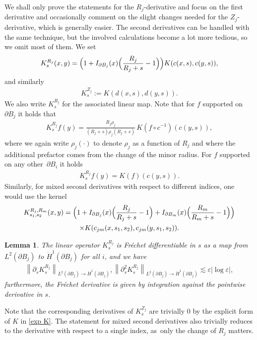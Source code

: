 \documentclass[10pt]{amsart}
\let\epsilon\varepsilon
\newtheorem{lemma}[theorem]{Lemma}
\theoremstyle{definition}
\newcommand\norm[1]{\left\lVert #1\right\rVert}
\newcommand\eq{=}
\let\de\partial
\let\eps\epsilon
\begin{document}
We shall only prove the statements for the $R_j$-derivative and focus on the first derivative and occasionally comment on the slight changes needed for the $Z_j$-derivative, which is generally easier. The second derivatives can be handled with the same technique, but the involved calculations become a lot more tedious, so we omit most of them.
We set
\begin{align*}
K_s^{R_j}(x,y)\eq \Bigl(1+I_{\de B_j}(x) \Bigl(\frac{R_j}{R_j+s}-1 \Bigr) \Bigr)K(c(x,s),c(y,s)),
\end{align*}
and similarly
\begin{align*}
K_s^{Z_j}:=K(d(x,s),d(y,s)).
\end{align*}
We also write $K_s^{R_j}$ for the associated linear map. Note that for $f$ supported on $\de B_j$ it holds that
\begin{align*}
K_s^{R_j}f(y)\eq\frac{R_j\rho_j}{(R_j+s)\rho_j(R_j+s)}\,K(f\circ c^{-1})(c(y,s)),
\end{align*}
where we again write $\rho_j(\cdot)$ to denote $\rho_j$ as a function of $R_j$ and where the additional prefactor comes from the change of the minor radius. For $f$ supported on any other~$\de B_i$ it holds
\begin{align*}
K_s^{R_j}f(y)\eq K(f)(c(y,s)).
\end{align*}
Similarly, for mixed second derivatives with respect to different indices, one would use the kernel\vspace*{-5pt}
\begin{multline*}
K_{s_1,s_2}^{R_j,R_m}(x,y)\eq \Bigl(1+I_{\de B_j}(x) \Bigl(\frac{R_j}{R_j+s}-1 \Bigr)+I_{\de B_m}(x) \Bigl(\frac{R_m}{R_m+s}-1 \Bigr) \Bigr)\\
\times K(c_{jm}(x,s_1,s_2),c_{jm}(y,s_1,s_2)).
\end{multline*}

\begin{lemma}\label{deri K}
The linear operator $K_s^{R_j}$ is Fréchet differentiable in $s$ as a map from $L^2(\de B_j)$ to $\dot{H}^1(\de B_j)$ for all $i$, and we have
\begin{align*}
\norm{\de_sK_s^{R_j}}_{L^2(\de B_j)\to \dot{H}^1(\de B_j)},\norm{\de_s^2K_s^{R_j}}_{L^2(\de B_j)\to \dot{H}^1(\de B_j)}\lesssim \eps|{\log\eps}|,
\end{align*}
furthermore, the Fréchet derivative is given by integration against the pointwise derivative in $s$.
\end{lemma}

Note that the corresponding derivatives of $K_s^{Z_j}$ are trivially $0$ by the explicit form of $K$ in \eqref{exp K}. The statement for mixed second derivatives also trivially reduces to the derivative with respect to a single index, as~only the change of $R_j$ matters.
\end{document}
